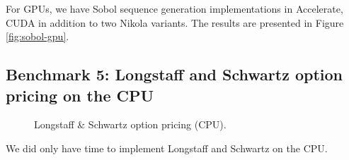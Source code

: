 For GPUs, we have Sobol sequence generation implementations in
Accelerate, CUDA in addition to two Nikola variants. The results are
presented in Figure \ref{fig:sobol-gpu}. 

\subsection{Benchmark 5: Longstaff and Schwartz option pricing on the CPU}
\begin{figure}
	\centering
\begin{adjustbox}{minipage=1.3\textwidth,margin=0pt \smallskipamount,center}
\end{adjustbox}
  \caption{Longstaff \& Schwartz option pricing (CPU).}
\label{fig:lsm-cpu}
\end{figure}

We did only have time to implement Longstaff and Schwartz on the
CPU. 



